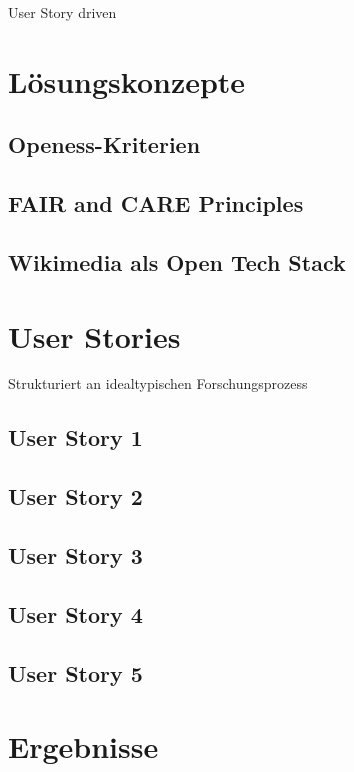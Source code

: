 \onehalfspacing

User Story driven

\section{Lösungskonzepte}
\subsection{Openess-Kriterien}
\subsection{FAIR and CARE Principles}
\subsection{Wikimedia als Open Tech Stack}

\section{User Stories}

Strukturiert an idealtypischen Forschungsprozess

\subsection{User Story 1}

\subsection{User Story 2}

\subsection{User Story 3}

\subsection{User Story 4}

\subsection{User Story 5}

\section{Ergebnisse}

